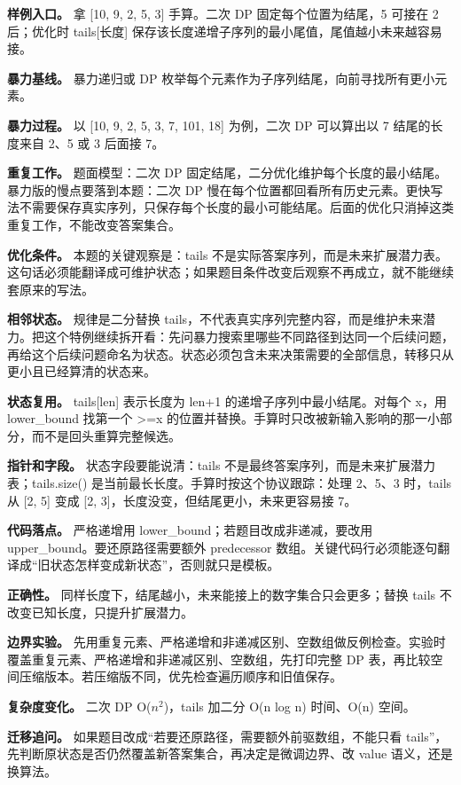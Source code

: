 \textbf{样例入口。} 拿 [10, 9, 2, 5, 3] 手算。二次 DP 固定每个位置为结尾，5 可接在 2 后；优化时 tails[长度] 保存该长度递增子序列的最小尾值，尾值越小未来越容易接。

\textbf{暴力基线。} 暴力递归或 DP 枚举每个元素作为子序列结尾，向前寻找所有更小元素。

\textbf{暴力过程。} 以 [10, 9, 2, 5, 3, 7, 101, 18] 为例，二次 DP 可以算出以 7 结尾的长度来自 2、5 或 3 后面接 7。

\textbf{重复工作。} 题面模型：二次 DP 固定结尾，二分优化维护每个长度的最小结尾。暴力版的慢点要落到本题：二次 DP 慢在每个位置都回看所有历史元素。更快写法不需要保存真实序列，只保存每个长度的最小可能结尾。后面的优化只消掉这类重复工作，不能改变答案集合。

\textbf{优化条件。} 本题的关键观察是：tails 不是实际答案序列，而是未来扩展潜力表。这句话必须能翻译成可维护状态；如果题目条件改变后观察不再成立，就不能继续套原来的写法。

\textbf{相邻状态。} 规律是二分替换 tails，不代表真实序列完整内容，而是维护未来潜力。把这个特例继续拆开看：先问暴力搜索里哪些不同路径到达同一个后续问题，再给这个后续问题命名为状态。状态必须包含未来决策需要的全部信息，转移只从更小且已经算清的状态来。

\textbf{状态复用。} tails[len] 表示长度为 len+1 的递增子序列中最小结尾。对每个 x，用 lower\_bound 找第一个 >=x 的位置并替换。手算时只改被新输入影响的那一小部分，而不是回头重算完整候选。

\textbf{指针和字段。} 状态字段要能说清：tails 不是最终答案序列，而是未来扩展潜力表；tails.size() 是当前最长长度。手算时按这个协议跟踪：处理 2、5、3 时，tails 从 [2, 5] 变成 [2, 3]，长度没变，但结尾更小，未来更容易接 7。

\textbf{代码落点。} 严格递增用 lower\_bound；若题目改成非递减，要改用 upper\_bound。要还原路径需要额外 predecessor 数组。关键代码行必须能逐句翻译成“旧状态怎样变成新状态”，否则就只是模板。

\textbf{正确性。} 同样长度下，结尾越小，未来能接上的数字集合只会更多；替换 tails 不改变已知长度，只提升扩展潜力。

\textbf{边界实验。} 先用重复元素、严格递增和非递减区别、空数组做反例检查。实验时覆盖重复元素、严格递增和非递减区别、空数组，先打印完整 DP 表，再比较空间压缩版本。若压缩版不同，优先检查遍历顺序和旧值保存。

\textbf{复杂度变化。} 二次 DP O(\ensuremath{n^{2}})，tails 加二分 O(n log n) 时间、O(n) 空间。

\textbf{迁移追问。} 如果题目改成“若要还原路径，需要额外前驱数组，不能只看 tails”，先判断原状态是否仍然覆盖新答案集合，再决定是微调边界、改 value 语义，还是换算法。


